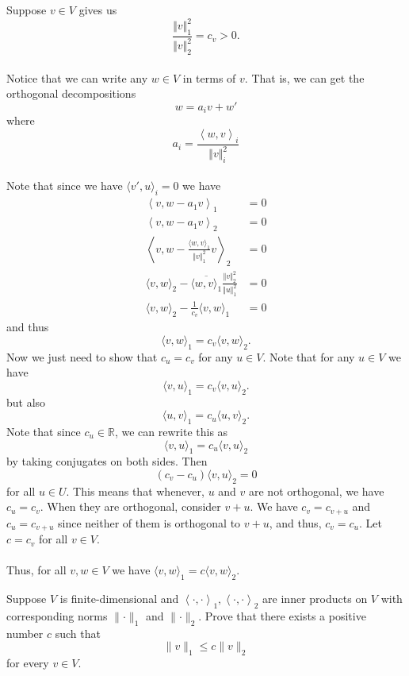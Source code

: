 \documentclass[12pt, letterpaper]{hmcpset}
\begin{document}
\begin{solution}
	Suppose $v \in V$ gives us
	\[
		\frac{\Vert v \Vert_1^2}{\Vert v \Vert_2^2} = c_v > 0.
	\] \\
	Notice that we can write any $w \in V$ in terms of $v$. That is, we can get the orthogonal decompositions
	\[
		w = a_i v + w'
	\]
	where
	\[
		a_i = \frac{\left < w, v \right >_i}{\Vert v \Vert_i^2}
	\] \\
	Note that since we have $\langle v', u \rangle_i = 0$ we have
	\[
		\begin{split}
			\left < v, w - a_1 v \right >_1 & = 0 \\
			\left < v, w - a_1 v \right >_2 & = 0 \\
			\left < v, w - \frac{\langle w, v \rangle_1}{\Vert v \Vert_1^2} v \right >_2 & = 0 \\
			\langle v, w \rangle_2 - \overline{\langle w, v \rangle_1} \frac{\Vert v \Vert_2^2}{\Vert u \Vert_1^2} & = 0 \\
			\langle v, w \rangle_2 - \frac{1}{c_v} \langle v, w \rangle_1 & = 0
		\end{split}
	\]
	and thus
	\[
		\langle v, w \rangle_1 = c_v \langle v, w \rangle_2.
	\]
	Now we just need to show that $c_u = c_v$ for any $u \in V$. Note that for any $u \in V$ we have
	\[
		\langle v, u \rangle_1 = c_v \langle v, u \rangle_2.
	\]
	but also
	\[
		\langle u, v \rangle_1 = c_u \langle u, v \rangle_2.
	\]
	Note that since $c_u \in \mathbb{R}$, we can rewrite this as 
	\[
		\langle v, u \rangle_1 = c_u \langle v, u \rangle_2
	\]
	by taking conjugates on both sides. Then
	\[
		(c_v - c_u) \langle v, u \rangle_2 = 0
	\]
	for all $u \in U$. This means that whenever, $u$ and $v$ are not orthogonal, we have $c_u = c_v$. When they are orthogonal, consider $v + u$. We have $c_v = c_{v + u}$ and $c_u = c_{v + u}$ since neither of them is orthogonal to $v + u$, and thus, $c_v = c_u$. Let $c = c_v$ for all $v \in V$. \\\\
	Thus, for all $v, w \in V$ we have $\langle v, w \rangle_1 = c \langle v, w \rangle_2$.
\end{solution}

\pagebreak

\begin{problem}[12.]
	Suppose $V$ is finite-dimensional and $\left < \cdot, \cdot \right >_1, \left < \cdot, \cdot \right >_2$ are inner products on $V$ with corresponding norms $\lVert \cdot \rVert_1$ and $\lVert \cdot \rVert_2$. Prove that there exists a positive number $c$ such that
	\[
		\lVert v \rVert_1 \le c \lVert v \rVert_2
	\]
	for every $v \in V$.
\end{problem}
\end{document}
